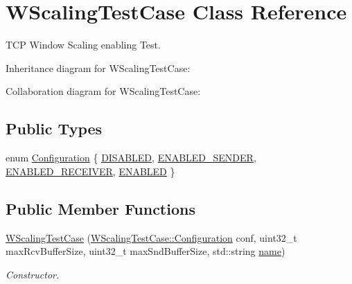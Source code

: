 \hypertarget{classWScalingTestCase}{}\section{W\+Scaling\+Test\+Case Class Reference}
\label{classWScalingTestCase}


T\+CP Window Scaling enabling Test.  




Inheritance diagram for W\+Scaling\+Test\+Case\+:


Collaboration diagram for W\+Scaling\+Test\+Case\+:
\subsection*{Public Types}
\begin{DoxyCompactItemize}
\item 
enum \hyperlink{classWScalingTestCase_a6b31fa8be505eaac47c2383fb17dc5fd}{Configuration} \{ \hyperlink{classWScalingTestCase_a6b31fa8be505eaac47c2383fb17dc5fda38d8cd6b561bf9a66c26f3ed77484267}{D\+I\+S\+A\+B\+L\+ED}, 
\hyperlink{classWScalingTestCase_a6b31fa8be505eaac47c2383fb17dc5fda605d0a930221d4226dfee3e4c89b47a3}{E\+N\+A\+B\+L\+E\+D\+\_\+\+S\+E\+N\+D\+ER}, 
\hyperlink{classWScalingTestCase_a6b31fa8be505eaac47c2383fb17dc5fda2019990e4d73c728a156c14570c9feef}{E\+N\+A\+B\+L\+E\+D\+\_\+\+R\+E\+C\+E\+I\+V\+ER}, 
\hyperlink{classWScalingTestCase_a6b31fa8be505eaac47c2383fb17dc5fdae72009ae17f1ed4d86c7c67734348f68}{E\+N\+A\+B\+L\+ED}
 \}
\end{DoxyCompactItemize}
\subsection*{Public Member Functions}
\begin{DoxyCompactItemize}
\item 
\hyperlink{classWScalingTestCase_a23908419cd0bade5255fe9b1b8cb2245}{W\+Scaling\+Test\+Case} (\hyperlink{classWScalingTestCase_a6b31fa8be505eaac47c2383fb17dc5fd}{W\+Scaling\+Test\+Case\+::\+Configuration} conf, uint32\+\_\+t max\+Rcv\+Buffer\+Size, uint32\+\_\+t max\+Snd\+Buffer\+Size, std\+::string \hyperlink{generate__test__data__lte__spectrum__model_8m_ab74e6bf80237ddc4109968cedc58c151}{name})
\begin{DoxyCompactList}\small\item\em Constructor. \end{DoxyCompactList}\end{DoxyCompactItemize}
